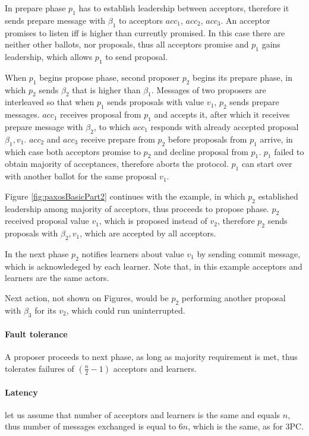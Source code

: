 In prepare phase $p_1$ has to establish leadership between acceptors, therefore it sends prepare message with $\beta_1$ to acceptors $acc_1$, $acc_2$, $acc_3$. An acceptor promises to listen iff \ballot is higher than currently promised. In this case there are neither other ballots, nor proposals, thus all acceptors promise and $p_1$ gains leadership, which allows $p_1$ to send proposal.

When $p_1$ begins propose phase, second proposer $p_2$ begins its prepare phase, in which $p_2$ sends $\beta_2$ that is higher than $\beta_1$. Messages of two proposers are interleaved so that when $p_1$ sends proposals with value $v_1$, $p_2$ sends prepare messages. $acc_1$ receives proposal from $p_1$ and accepts it, after which it receives prepare message with $\beta_2$, to which $acc_1$ responds with already accepted proposal $\beta_1,v_1$.
$acc_2$ and $acc_3$ receive prepare from $p_2$ before proposals from $p_1$ arrive, in which case both acceptors promise to $p_2$ and decline proposal from $p_1$. $p_1$ failed to obtain majority of acceptances, therefore aborts the protocol. $p_1$ can start over with another ballot for the same proposal $v_1$. 

Figure \ref{fig:paxosBasicPart2} continues with the example, in which
 $p_2$ established leadership among majority of acceptors, thus proceeds to propose phase. $p_2$ received proposal value $v_1$, which is proposed instead of $v_2$, therefore $p_2$ sends proposals with $\beta_2,v_1$, which are accepted by all acceptors.

 In the next phase $p_2$ notifies learners about value $v_1$ by sending commit message, which is acknowledeged by each learner. Note that, in this example acceptors and learners are the same actors.

 Next action, not shown on Figures, would be $p_2$ performing another proposal with $\beta_3$ for its $v_2$, which could run uninterrupted. 

 \paragraph{Fault tolerance} A proposer proceeds to next phase, as long as majority requirement is met, thus \paxos tolerates failures of 
 $(\frac{n}{2}-1)$ acceptors and learners.

 \paragraph{Latency} let us assume that number of acceptors and learners is the same and equals $n$, thus number of messages exchanged is equal to $6n$, which is the same, as for 3PC.

